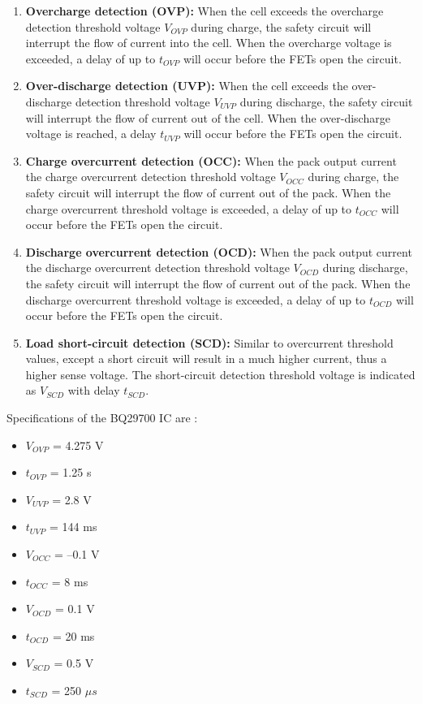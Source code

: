 \documentclass[11pt,a4paper]{article}
\begin{document}
\begin{enumerate}
	\item \textbf{Overcharge detection (OVP):} When the cell exceeds the overcharge detection threshold voltage $V_{OVP}$ during charge, the safety circuit will interrupt the flow of current into the cell. When the overcharge voltage is exceeded, a delay of up to $t_{OVP}$ will occur before the FETs open the circuit.
	\item \textbf{Over-discharge detection (UVP):} When the cell exceeds the over-discharge detection threshold voltage $V_{UVP}$ during discharge, the safety circuit will interrupt the flow of current out of the cell. When the over-discharge voltage is reached, a delay $t_{UVP}$ will occur before the FETs open the circuit.
	\item \textbf{Charge overcurrent detection (OCC):} When the pack output current the charge overcurrent detection threshold voltage $V_{OCC}$ during charge, the safety circuit will interrupt the flow of current out of the pack. When the charge overcurrent threshold voltage is exceeded, a delay of up to $t_{OCC}$ will occur before the FETs open the circuit.
	\item \textbf{Discharge overcurrent detection (OCD):} When the pack output current the discharge overcurrent detection threshold voltage $V_{OCD}$ during discharge, the safety circuit will interrupt the flow of current out of the pack. When the discharge overcurrent threshold voltage is exceeded, a delay of up to $t_{OCD}$ will occur before the FETs open the circuit.
	\item \textbf{Load short-circuit detection (SCD):} Similar to overcurrent threshold values, except a short circuit will result in a much higher current, thus a higher sense voltage. The short-circuit detection threshold voltage is indicated as $V_{SCD}$ with delay $t_{SCD}$.
\end{enumerate}
Specifications of the BQ29700 IC are \cite{bib:BQ29700}:
\begin{itemize}
	\item $V_{OVP}$ = 4.275 V
	\item $t_{OVP}$ = 1.25 s
	\item $V_{UVP}$ = 2.8 V
	\item $t_{UVP}$ = 144 ms
	\item $V_{OCC}$ = –0.1 V
	\item $t_{OCC}$ = 8 ms
	\item $V_{OCD}$ = 0.1 V
	\item $t_{OCD}$ = 20 ms
	\item $V_{SCD}$ = 0.5 V
	\item $t_{SCD}$ = 250 $\mu s$
\end{itemize}
\end{document}
